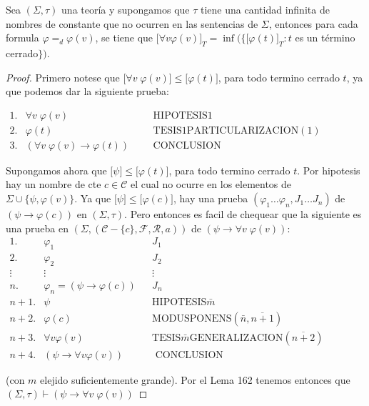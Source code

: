   \begin{lemma}
    \PN Sea $(\Sigma, \tau)$ una teoría y supongamos que $\tau$ tiene una cantidad infinita de nombres de constante que
    no ocurren en las sentencias de $\Sigma$, entonces para cada formula $\varphi =_{d} \varphi(v)$, se tiene que
    $\lbrack \forall v\varphi (v) \rbrack_{T} = \inf(\{\lbrack \varphi(t) \rbrack_{T}: t$ es un término cerrado$\})$.
  \end{lemma}
  \begin{proof}
    Primero notese que $\lbrack\forall v\;\varphi (v)\rbrack\leq \lbrack \varphi (t)\rbrack$, para todo termino cerrado $t$, ya que podemos dar la siguiente prueba:

    $\displaystyle \begin{array}{cllll} 1. & \forall v\;\varphi (v) & & & \text{HIPOTESIS}1 \\ 2. & \varphi (t) & & & \text{TESIS}1\text{PARTICULARIZACION}(1) \\ 3. & (\forall v\;\varphi (v)\rightarrow \varphi (t)) & & & \text{CONCLUSION } \end{array} $

    Supongamos ahora que $\lbrack\psi \rbrack\leq \lbrack \varphi (t)\rbrack$, para todo termino cerrado $t.$ Por hipotesis hay un nombre de cte $c\in \mathcal{C}$ el cual no ocurre en los elementos de $\Sigma \cup \{\psi ,\varphi (v)\}.$ Ya que $ \lbrack\psi \rbrack\leq \lbrack \varphi (c)\rbrack$, hay una prueba $(\varphi_{1}\dotsc\varphi_{n},J_{1}\dotsc J_{n})$ de $\left( \psi \rightarrow \varphi (c)\right) $ en $(\Sigma, \tau)$. Pero entonces es facil de chequear que la siguiente es una prueba en $(\Sigma ,(\mathcal{C}-\{c\},\mathcal{F},\mathcal{R},a))$ de $ \left( \psi \rightarrow \forall v\;\varphi (v)\right) $:
    $\displaystyle \begin{array}{rlcl} 1. & \varphi_{1} & & J_{1} \\ 2. & \varphi_{2} & & J_{2} \\ \vdots & \vdots & & \vdots \\ n. & \varphi_{n}=\left( \psi \rightarrow \varphi (c)\right) & & J_{n} \\ n+1. & \psi & & \text{HIPOTESIS}\bar{m} \\ n+2. & \varphi (c) & & \text{MODUSPONENS}(\bar{n},\overline{n+1}) \\ n+3. & \forall v\varphi (v) & & \text{TESIS}\bar{m}\text{GENERALIZACION}( \overline{n+2}) \\ n+4. & \left( \psi \rightarrow \forall v\varphi (v)\right) & & \text{ CONCLUSION} \end{array} $

    (con $m$ elejido suficientemente grande). Por el Lema 162 tenemos entonces que $(\Sigma, \tau)\vdash \left( \psi \rightarrow \forall v\;\varphi (v)\right) $
  \end{proof}

